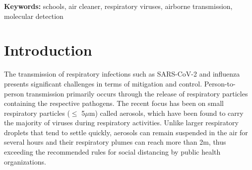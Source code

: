 \documentclass[fleqn,11pt]{wlscirep}
\begin{document}

\flushbottom
\maketitle
\setcounter{page}{1}
\thispagestyle{fancy}

\vspace{2em}


\vspace{0.5em}

\noindent\textbf{Keywords:} schools, air cleaner, respiratory viruses, airborne transmission, molecular detection
\newpage

\sloppy
\raggedbottom

\newpage

\section{Introduction} 

The transmission of respiratory infections such as SARS-CoV-2 and influenza presents significant challenges in terms of mitigation and control. Person-to-person transmission primarily occurs through the release of respiratory particles containing the respective pathogens. The recent focus has been on small respiratory particles ($\leq$ 5$\mu$m) called aerosols, which have been found to carry the majority of viruses during respiratory activities\cite{Fennelly2020}. Unlike larger respiratory droplets that tend to settle quickly, aerosols can remain suspended in the air for several hours and their respiratory plumes can reach more than 2m\cite{Coleman2022,Wang2020,Heneghan2021}, thus exceeding the recommended rules for social distancing by public health organizations\cite{Bazant2021PNAS,Trivedi2021PhyFluids,Lindsley2010CID}. 
\end{document}
